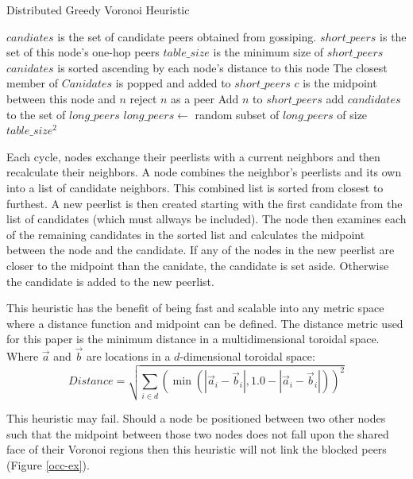 \documentclass{IEEEtran}
\begin{document}
\begin{algorithm}
\caption{Distributed Greedy Voronoi Heuristic}
\label{DGVH}
\begin{algorithmic}[1]  %
	\STATE $candiates$ is the set of candidate peers obtained from gossiping.
    \STATE $short\_peers$ is the set of this node's one-hop peers
    \STATE $table\_size$ is the minimum size of $short\_peers$
    \STATE $canidates$ is sorted  ascending by each node's distance to this node
    \STATE The closest member of $Canidates$ is popped and added to $short\_peers$
    	\STATE $c$ is the midpoint between this node and $n$
        	\STATE reject $n$ as a peer
        \ELSE
        	\STATE Add $n$ to $short\_peers$
        \ENDIF
    \ENDFOR
    		\STATE add $candidates$ to the set of $long\_peers$
        		\STATE $long\_peers \leftarrow$ random subset of $long\_peers$ of size $table\_size^2$
        	\ENDIF
    	\ENDFOR
    \ENDWHILE
\end{algorithmic}
\end{algorithm}


Each cycle, nodes exchange their peerlists with a current neighbors and then recalculate their neighbors.  
A node combines the neighbor's peerlists and its own into a list of candidate neighbors.
This combined list is sorted from closest to furthest.
A new peerlist is then created starting with the first candidate from the list of candidates (which must allways be included).
The node then examines each of the remaining candidates in the sorted list and calculates the midpoint between the node and the candidate.
If any of the nodes in the new peerlist are closer to the midpoint than the canidate, the candidate is set aside.  Otherwise the candidate is added to the new peerlist.

This heuristic has the benefit of being fast and scalable into any metric space where a distance function and midpoint can be defined.
The distance metric used for this paper is the minimum distance in a multidimensional toroidal space.
Where $\vec{a}$ and $\vec{b}$ are locations in a $d$-dimensional toroidal space:
\[ Distance = \sqrt{\sum\limits_{i\in d} (\min(|\vec{a}_i-\vec{b}_i|, 1.0-|\vec{a}_i-\vec{b}_i|))^2}\]




This heuristic may fail.
Should a node be positioned between two other nodes such that the midpoint between those two nodes does not fall upon the shared face of their Voronoi regions then this heuristic will not link the blocked peers  (Figure \ref{occ-ex}). %
\end{document}
